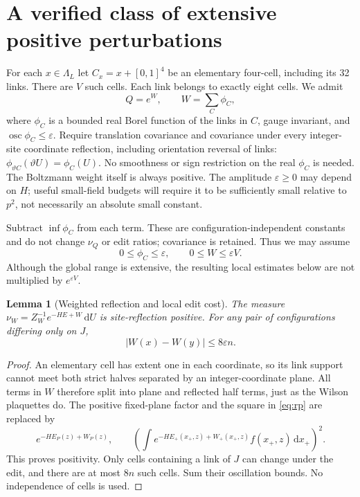 \documentclass[11pt]{article}
\newtheorem{lemma}[theorem]{Lemma}
\theoremstyle{definition}
\theoremstyle{remark}
\newcommand{\dd}{\,\mathrm d}
\newcommand{\osc}{\operatorname{osc}}
\begin{document}
\section{A verified class of extensive positive perturbations}
\label{sec:cells}
For each $x\in\Lambda_L$ let $C_x=x+[0,1]^4$ be an elementary four-cell,
including its 32 links. There are $V$ such cells. Each link belongs to
exactly eight cells. We admit
\begin{equation}
 Q=e^W,\qquad W=\sum_C\phi_C,
 \label{eq:cellweight}
\end{equation}
where $\phi_C$ is a bounded real Borel function of the links in $C$,
gauge invariant, and $\osc\phi_C\le\varepsilon$. Require translation
covariance and covariance under every integer-site coordinate reflection,
including orientation reversal of links:
$\phi_{\vartheta C}(\vartheta U)=\phi_C(U)$. No smoothness or sign
restriction on the real $\phi_C$ is needed. The Boltzmann weight itself
is always positive. The amplitude $\varepsilon\ge0$ may depend on $H$;
useful small-field budgets will require it to be sufficiently small
relative to $p^2$, not necessarily an absolute small constant.

Subtract $\inf\phi_C$ from each term. These are configuration-independent
constants and do not change $\nu_Q$ or edit ratios; covariance is retained.
Thus we may assume
\begin{equation}
 0\le\phi_C\le\varepsilon,\qquad 0\le W\le\varepsilon V.
 \label{eq:range}
\end{equation}
Although the global range is extensive, the resulting local estimates
below are not multiplied by $e^{\varepsilon V}$.

\begin{lemma}[Weighted reflection and local edit cost]\label{lem:cellrp}
The measure $\nu_W=Z_W^{-1}e^{-HE+W}\dd U$ is site-reflection positive.
For any pair of configurations differing only on $J$,
\begin{equation}
 |W(x)-W(y)|\le8\varepsilon n.
 \label{eq:edit}
\end{equation}
\end{lemma}
\begin{proof}
An elementary cell has extent one in each coordinate, so its link support
cannot meet both strict halves separated by an integer-coordinate plane.
All terms in $W$ therefore split into plane and reflected half terms,
just as the Wilson plaquettes do. The positive fixed-plane factor and
the square in \eqref{eq:rp} are replaced by
\[
 e^{-HE_P(z)+W_P(z)},\qquad
 \left(\int e^{-HE_+(x_+,z)+W_+(x_+,z)}f(x_+,z)\dd x_+\right)^2.
\]
This proves positivity. Only cells containing a link of $J$ can change
under the edit, and there are at most $8n$ such cells. Sum their
oscillation bounds. No independence of cells is used.
\end{proof}
\end{document}

